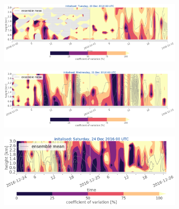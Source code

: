
\begin{figure}[t]
	\centering
		\begin{subfigure}[t]{\textwidth}		\includegraphics[trim={0.cm 5.3cm 0cm 0cm},clip,width=\textwidth]{./fig_variation/20161220}
			\caption{}\label{fig:ens_vari20}
		\end{subfigure}
		\begin{subfigure}[t]{\textwidth}		\includegraphics[trim={0.cm 5.3cm 0cm 0cm},clip,width=\textwidth]{./fig_variation/20161221}
			\caption{}\label{fig:ens_vari21}
		\end{subfigure}
       
     	\begin{subfigure}[t]{\textwidth}		\includegraphics[trim={15.cm 0cm 15cm 21cm},clip,width=\textwidth]{./fig_variation/20161224}
		\end{subfigure}
\end{figure}
